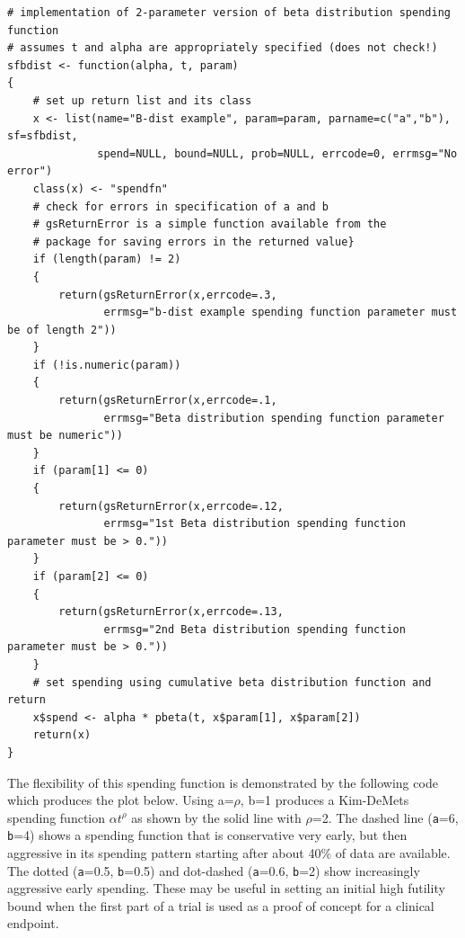 \bigskip
\begin{verbatim}
# implementation of 2-parameter version of beta distribution spending function
# assumes t and alpha are appropriately specified (does not check!)
sfbdist <- function(alpha, t, param)
{
    # set up return list and its class
    x <- list(name="B-dist example", param=param, parname=c("a","b"), sf=sfbdist,
              spend=NULL, bound=NULL, prob=NULL, errcode=0, errmsg="No error")
    class(x) <- "spendfn"
    # check for errors in specification of a and b
    # gsReturnError is a simple function available from the 
    # package for saving errors in the returned value}
    if (length(param) != 2) 
    {
        return(gsReturnError(x,errcode=.3,
               errmsg="b-dist example spending function parameter must be of length 2"))
    }
    if (!is.numeric(param)) 
    {
        return(gsReturnError(x,errcode=.1,
               errmsg="Beta distribution spending function parameter must be numeric"))
    }
    if (param[1] <= 0) 
    {
        return(gsReturnError(x,errcode=.12,
               errmsg="1st Beta distribution spending function parameter must be > 0."))
    }
    if (param[2] <= 0) 
    {
        return(gsReturnError(x,errcode=.13,
               errmsg="2nd Beta distribution spending function parameter must be > 0."))
    }
    # set spending using cumulative beta distribution function and return
    x$spend <- alpha * pbeta(t, x$param[1], x$param[2])
    return(x)
}
\end{verbatim}
\bigskip

The flexibility of this spending function is demonstrated by the following
code which produces the plot below. Using a=$\rho$, b=1 produces a Kim-DeMets
spending function $\alpha t^{\rho}$ as shown by the solid line with $\rho$=2.
The dashed line (\texttt{a}=6, \texttt{b}=4) shows a spending function that is
conservative very early, but then aggressive in its spending pattern starting
after about 40\% of data are available. The dotted (\texttt{a}=0.5,
\texttt{b}=0.5) and dot-dashed (\texttt{a}=0.6, \texttt{b}=2) show
increasingly aggressive early spending. These may be useful in setting an
initial high futility bound when the first part of a trial is used as a proof
of concept for a clinical endpoint.

\bigskip

